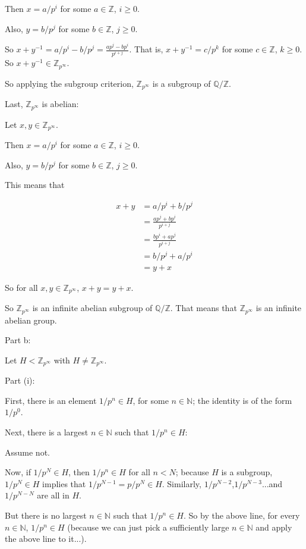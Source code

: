 \documentclass[a4paper,12pt]{article}
\newcommand{\tab}{\hspace{4mm}} %
\newcommand{\shunt}{\vspace{20mm}}
\newcommand{\N}{\mathbb{N}}
\newcommand{\Q}{\mathbb{Q}}
\newcommand{\Z}{\mathbb{Z}}
\begin{document}
\tab Then $x = a/p^i$ for some $a \in \Z$, $i \geq 0$.

\tab Also, $y = b/p^j$ for some $b \in \Z$, $j \geq 0$.

\tab So $x+y^{-1} = a/p^i - b/p^j = \frac{ap^j - bp^i}{p^{i+j}}$. That is, $x+y^{-1} = c/p^k$ for some $c \in \Z$, $k \geq 0$. So $x+y^{-1} \in \Z_{p^\infty}$.

\tab So applying the subgroup criterion, $\Z_{p^\infty}$ is a subgroup of $\Q/\Z$. 

Last, $\Z_{p^\infty}$ is abelian:

\tab Let $x, y \in \Z_{p^\infty}$.

\tab Then $x = a/p^i$ for some $a \in \Z$, $i \geq 0$.

\tab Also, $y = b/p^j$ for some $b \in \Z$, $j \geq 0$.

\tab This means that 

\begin{align*}
x+y &= a/p^i + b/p^j \\
&= \frac{ap^j + bp^i}{p^{i+j}}\\
&= \frac{ bp^i+ ap^j}{p^{i+j}}\\
&= b/p^j+ a/p^i\\
&= y+x
\end{align*}

\tab So for all $x, y \in \Z_{p^\infty}$, $x+y=y+x$.

So $\Z_{p^\infty}$ is an infinite abelian subgroup of $\Q/\Z$. That means that $\Z_{p^\infty}$ is an infinite abelian group.

\shunt

Part b:

Let $H < \Z_{p^\infty}$ with $H \neq \Z_{p^\infty}$.

Part (i):

First, there is an element $1/p^n \in H$, for some $n \in \N$; the identity is of the form $1/p^0$.

Next, there is a largest $n \in \N$ such that $1/p^n \in H$:

\tab Assume not.

\tab Now, if $1/p^N \in H$, then $1/p^n \in H$ for all $n < N$; because $H$ is a subgroup, $1/p^N \in H$ implies that $1/p^{N-1} = p/p^N \in H$. Similarly, $1/p^{N-2}$,$1/p^{N-3}$...and $1/p^{N-N}$ are all in $H$.

\tab But there is no largest $n \in \N$ such that $1/p^n \in H$. So by the above line, for every $n \in \N$, $1/p^n \in H$ (because we can just pick a sufficiently large $n \in \N$ and apply the above line to it...).
\end{document}
